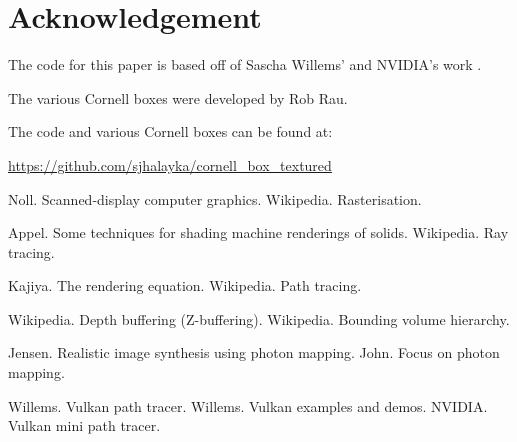 \documentclass[12pt]{article}
\begin{document}
\section{Acknowledgement}

The code for this paper is based off of Sascha Willems' and NVIDIA's work \cite{willems1, willems2, nvidia}.

The various Cornell boxes were developed by Rob Rau.

The code and various Cornell boxes can be found at: 

\url{https://github.com/sjhalayka/cornell_box_textured}








\begin{thebibliography}{9}

 Noll. Scanned-display computer graphics.
 Wikipedia. Rasterisation.

 Appel. Some techniques for shading machine renderings of solids.
 Wikipedia. Ray tracing.

 Kajiya. The rendering equation.
 Wikipedia. Path tracing.

 Wikipedia. Depth buffering (Z-buffering).
 Wikipedia. Bounding volume hierarchy.


 Jensen. Realistic image synthesis using photon mapping.
 John. Focus on photon mapping.

 Willems. Vulkan path tracer.
 Willems. Vulkan examples and demos.
 NVIDIA. Vulkan mini path tracer.



\end{thebibliography}


\pagebreak
\end{document}

